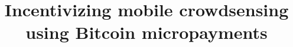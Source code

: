 \documentclass{sig-alternate}
\begin{document}
%

\title{Incentivizing mobile crowdsensing using Bitcoin micropayments}


%
%
%
%
%

%
\author{
%
%
 }
\end{document}
